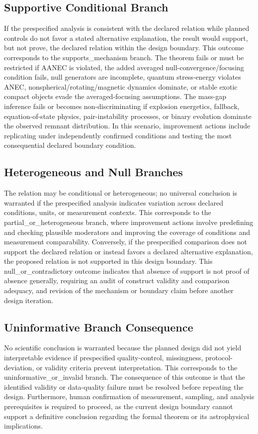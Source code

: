 \documentclass[conference]{IEEEtran}
\begin{document}
\subsection{Supportive Conditional Branch}
If the prespecified analysis is consistent with the declared relation while planned controls do not favor a stated alternative explanation, the result would support, but not prove, the declared relation within the design boundary. This outcome corresponds to the supports\_mechanism branch. The theorem fails or must be restricted if AANEC is violated, the added averaged null-convergence/focusing condition fails, null generators are incomplete, quantum stress-energy violates ANEC, nonspherical/rotating/magnetic dynamics dominate, or stable exotic compact objects evade the averaged-focusing assumptions. The mass-gap inference fails or becomes non-discriminating if explosion energetics, fallback, equation-of-state physics, pair-instability processes, or binary evolution dominate the observed remnant distribution. In this scenario, improvement actions include replicating under independently confirmed conditions and testing the most consequential declared boundary condition.

\subsection{Heterogeneous and Null Branches}
The relation may be conditional or heterogeneous; no universal conclusion is warranted if the prespecified analysis indicates variation across declared conditions, units, or measurement contexts. This corresponds to the partial\_or\_heterogeneous branch, where improvement actions involve predefining and checking plausible moderators and improving the coverage of conditions and measurement comparability. Conversely, if the prespecified comparison does not support the declared relation or instead favors a declared alternative explanation, the proposed relation is not supported in this design boundary. This null\_or\_contradictory outcome indicates that absence of support is not proof of absence generally, requiring an audit of construct validity and comparison adequacy, and revision of the mechanism or boundary claim before another design iteration.

\subsection{Uninformative Branch Consequence}
No scientific conclusion is warranted because the planned design did not yield interpretable evidence if prespecified quality-control, missingness, protocol-deviation, or validity criteria prevent interpretation. This corresponds to the uninformative\_or\_invalid branch. The consequence of this outcome is that the identified validity or data-quality failure must be resolved before repeating the design. Furthermore, human confirmation of measurement, sampling, and analysis prerequisites is required to proceed, as the current design boundary cannot support a definitive conclusion regarding the formal theorem or its astrophysical implications.
\end{document}

